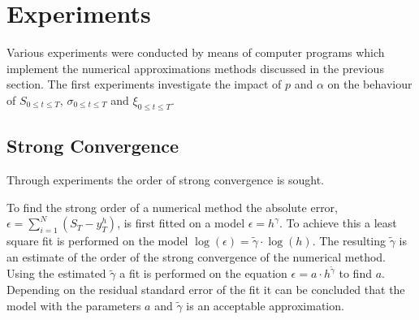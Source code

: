 \documentclass[a4paper,onecolumn,draft]{IEEEtran}
\begin{document}
\section{Experiments}
Various experiments were conducted by means of computer programs which
implement the numerical approximations methods discussed in the previous
section. The first experiments investigate the impact of $p$ and $\alpha$ on
the behaviour of $S_{0 \leq t \leq T}$, $\sigma_{0 \leq t \leq T}$ and
$\xi_{0 \leq t \leq T}$. 

\subsection{Strong Convergence}
Through experiments the order of strong convergence is sought.


To find the strong order of a numerical method the absolute error, $\epsilon = \sum_{i =
1}^N (S_T - y_T^h)$, is first fitted on a model $\epsilon = h^\gamma$.  To
achieve this a least square fit is performed on the model $\log(\epsilon) =
\widetilde{\gamma}\cdot\log(h)$.  The resulting $\widetilde{\gamma}$ is an
estimate of the order of the strong convergence of the numerical method. Using
the estimated $\widetilde{\gamma}$ a fit is performed on the equation
$\epsilon = a\cdot h^{\widetilde{\gamma}}$ to find $a$. Depending on the
residual standard error of the fit it can be concluded that the model with the
parameters $a$ and $\widetilde{\gamma}$ is an acceptable approximation.
\end{document}
